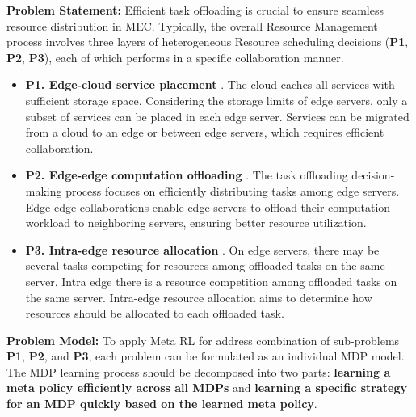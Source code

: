 \documentclass[12pt]{article}
\begin{document}
\vspace{3mm}



\noindent\textbf{\large Problem Statement: } Efficient task offloading is crucial to ensure seamless resource distribution in MEC.
Typically, the overall Resource Management process involves three layers of heterogeneous Resource scheduling decisions (\textbf{P1}, \textbf{P2}, \textbf{P3}), each of which performs in a specific collaboration manner. \vspace{-2mm}

\begin{itemize}
	
	\item \textbf{P1. Edge-cloud service placement} \cite{farhadi2021service}.  %
	The cloud caches all services with sufficient storage space. Considering the storage limits of edge servers, only a subset of services can be placed in each edge server. Services can be migrated from a cloud to an edge or between edge servers, which requires efficient collaboration.\vspace{-2mm}
	
	\item\textbf{P2. Edge-edge computation offloading} \cite{han2022edgetuner}. The task offloading decision-making process focuses on efficiently distributing tasks among edge servers. Edge-edge collaborations enable edge servers to offload their computation workload to neighboring servers, ensuring better resource utilization. \vspace{-2mm}
	
	\item\textbf{P3. Intra-edge resource allocation} \cite{xiong2020resource}. On edge servers, there may be several tasks competing for resources among offloaded tasks on the same server. Intra edge there is a resource competition among offloaded tasks on the same server. Intra-edge resource allocation aims to determine how resources should be allocated to each offloaded task.
	
\end{itemize}

\vspace{0mm}

\noindent\textbf{\large Problem Model: } To apply Meta RL for address combination of sub-problems  \textbf{P1},  \textbf{P2}, and \textbf{P3}, each problem can be formulated as an individual MDP model. The MDP learning process should be decomposed into two parts: \textbf{learning a meta policy efficiently across all MDPs} and \textbf{learning a specific strategy for an MDP quickly based on the learned meta policy}.
\noindent
\end{document}
